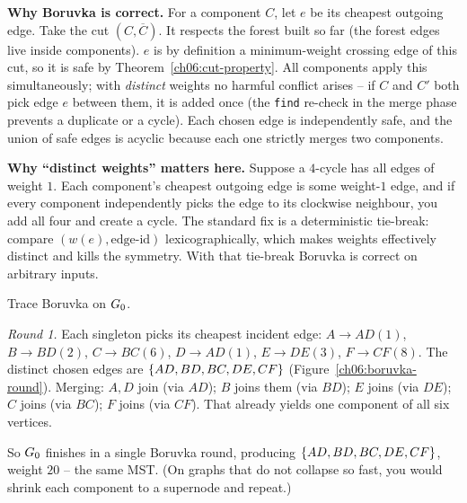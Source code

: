 \begin{whybox}
\textbf{Why Boruvka is correct.} For a component $C$, let $e$ be its cheapest outgoing edge. Take the cut $(C,\overline C)$. It respects the forest built so far (the forest edges live inside components). $e$ is by definition a minimum-weight crossing edge of this cut, so it is safe by Theorem~\ref{ch06:cut-property}. All components apply this simultaneously; with \emph{distinct} weights no harmful conflict arises -- if $C$ and $C'$ both pick edge $e$ between them, it is added once (the \texttt{find} re-check in the merge phase prevents a duplicate or a cycle). Each chosen edge is independently safe, and the union of safe edges is acyclic because each one strictly merges two components.
\end{whybox}

\begin{trapbox}
\textbf{Why ``distinct weights'' matters here.} Suppose a $4$-cycle has all edges of weight $1$. Each component's cheapest outgoing edge is some weight-$1$ edge, and if every component independently picks the edge to its clockwise neighbour, you add all four and create a cycle. The standard fix is a deterministic tie-break: compare $(w(e),\text{edge-id})$ lexicographically, which makes weights effectively distinct and kills the symmetry. With that tie-break Boruvka is correct on arbitrary inputs.
\end{trapbox}

\begin{labbox}
Trace Boruvka on $G_0$.

\emph{Round 1.} Each singleton picks its cheapest incident edge:
$A\!\to\!AD(1)$, $B\!\to\!BD(2)$, $C\!\to\!BC(6)$, $D\!\to\!AD(1)$, $E\!\to\!DE(3)$, $F\!\to\!CF(8)$.
The distinct chosen edges are $\{AD,BD,BC,DE,CF\}$ (Figure~\ref{ch06:boruvka-round}). Merging: $A,D$ join (via $AD$); $B$ joins them (via $BD$); $E$ joins (via $DE$); $C$ joins (via $BC$); $F$ joins (via $CF$). That already yields one component of all six vertices.

So $G_0$ finishes in a single Boruvka round, producing $\{AD,BD,BC,DE,CF\}$, weight $20$ -- the same MST. (On graphs that do not collapse so fast, you would shrink each component to a supernode and repeat.)
\end{labbox}

